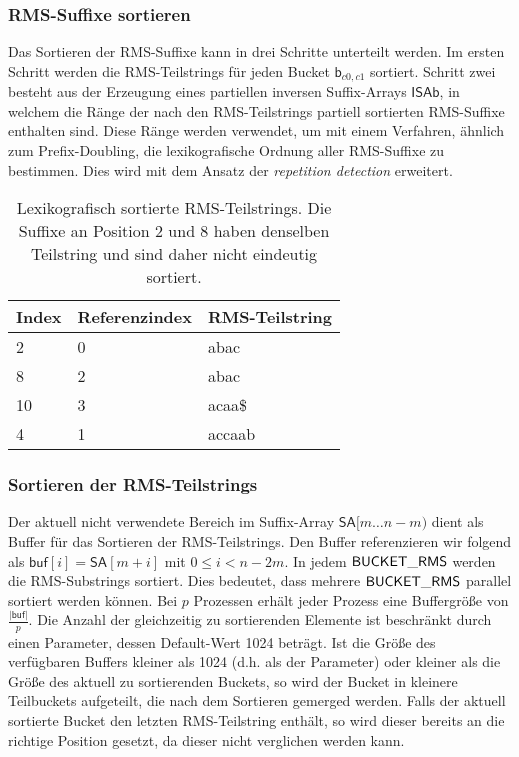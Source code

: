 \subsubsection{RMS-Suffixe sortieren}
Das Sortieren der RMS-Suffixe kann in drei Schritte unterteilt werden. Im ersten Schritt werden die RMS-Teilstrings für jeden Bucket $\mathsf{b}_{c0,c1}$ sortiert. Schritt zwei besteht aus der Erzeugung eines partiellen inversen Suffix-Arrays $\mathsf{ISAb}$, in welchem die Ränge der nach den RMS-Teilstrings partiell sortierten RMS-Suffixe enthalten sind. Diese Ränge werden verwendet, um mit einem Verfahren, ähnlich zum Prefix-Doubling, die lexikografische Ordnung aller RMS-Suffixe zu bestimmen. Dies wird mit dem Ansatz der \textit{repetition detection} erweitert.

\begin{table}
	\begin{tabular}{l|l|l}
		Index & Referenzindex & RMS-Teilstring \\ \hline
		2     & 0             & abac           \\ \hline
		8     & 2             & abac           \\ \hline
		10    & 3             & acaa\$         \\ \hline
		4     & 1             & accaab         \\ \hline
	\end{tabular}
	\caption{Lexikografisch sortierte RMS-Teilstrings. Die Suffixe an Position 2 und 8 haben denselben Teilstring und sind daher nicht eindeutig sortiert.}
	\label{dss:table:substrings}
\end{table}

\subsubsection{Sortieren der RMS-Teilstrings}
Der aktuell nicht verwendete Bereich im Suffix-Array $\mathsf{SA}[m\dots n-m)$ dient als Buffer für das Sortieren der RMS-Teilstrings. Den Buffer referenzieren wir folgend als $\mathsf{buf}[i] = \mathsf{SA}[m+i]$ mit $0 \leq i < n - 2m$. In jedem $\mathsf{BUCK\-ET\_RMS}$ werden die RMS-Substrings sortiert. Dies bedeutet, dass mehrere $\mathsf{BUCK\-ET\_RMS}$ parallel sortiert werden können. Bei $p$ Prozessen erhält jeder Prozess eine Buffergröße von $\frac{|\mathsf{buf}|}{p}$. Die Anzahl der gleichzeitig zu sortierenden Elemente ist beschränkt durch einen Parameter, dessen Default-Wert 1024 beträgt. Ist die Größe des verfügbaren Buffers kleiner als 1024 (d.h. als der Parameter) oder kleiner als die Größe des aktuell zu sortierenden Buckets, so wird der Bucket in kleinere Teilbuckets aufgeteilt, die nach dem Sortieren gemerged werden. Falls der aktuell sortierte Bucket den letzten RMS-Teilstring enthält, so wird dieser bereits an die richtige Position gesetzt, da dieser nicht verglichen werden kann. 


